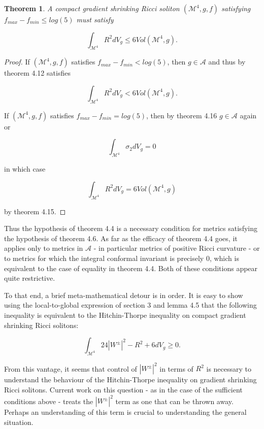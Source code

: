 \documentclass[openany, amssymb, psamsfonts]{amsart}
\newtheorem{thm}{Theorem}[section]
\theoremstyle{definition}
\numberwithin{equation}{section}
\begin{document}
\begin{thm}
A compact gradient shrinking Ricci soliton $(\mathcal{M}^4, g, f)$ satisfying $f_{max} - f_{min} \leq log(5)$ must satisfy

$$\int_{\mathcal{M}^4} R^2 dV_g \leq 6 Vol(\mathcal{M}^4, g).$$

\end{thm}

\begin{proof}
If $(\mathcal{M}^4, g, f)$ satisfies $f_{max} - f_{min} < log(5)$, then $g \in \mathcal{A}$ and thus by theorem 4.12 satisfies

$$\int_{\mathcal{M}^4} R^2 dV_g < 6 Vol(\mathcal{M}^4, g).$$

If $(\mathcal{M}^4, g, f)$ satisfies $f_{max} - f_{min} = log(5)$, then by theorem 4.16 $g \in \mathcal{A}$ again or 

$$\int_{\mathcal{M}^4} \sigma_2 dV_g = 0$$

in which case 

$$\int_{\mathcal{M}^4} R^2 dV_g = 6 Vol(\mathcal{M}^4, g)$$

by theorem 4.15.
\end{proof}




Thus the hypothesis of theorem 4.4 is a necessary condition for metrics satisfying the hypothesis of theorem 4.6. As far as the efficacy of theorem 4.4 goes, it applies only to metrics in $\mathcal{A}$ - in particular metrics of positive Ricci curvature - or to metrics for which the integral conformal invariant is precisely $0$, which is equivalent to the case of equality in theorem 4.4. Both of these conditions appear quite restrictive. 

To that end, a brief meta-mathematical detour is in order. It is easy to show using the local-to-global expression of section 3 and lemma 4.5 that the following inequality is equivalent to the Hitchin-Thorpe inequality on compact gradient shrinking Ricci solitons:

$$\int_{\mathcal{M}^4} 24 |W^\pm|^2 - R^2 + 6 dV_g \geq 0.$$

    From this vantage, it seems that control of $|W^\pm|^2$ in terms of $R^2$ is necessary to understand the behaviour of the Hitchin-Thorpe inequality on gradient shrinking Ricci solitons. Current work on this question - as in the case of the sufficient conditions above - treats the $|W^\pm|^2$ term as one that can be thrown away. Perhaps an understanding of this term is crucial to understanding the general situation. 
\end{document}
